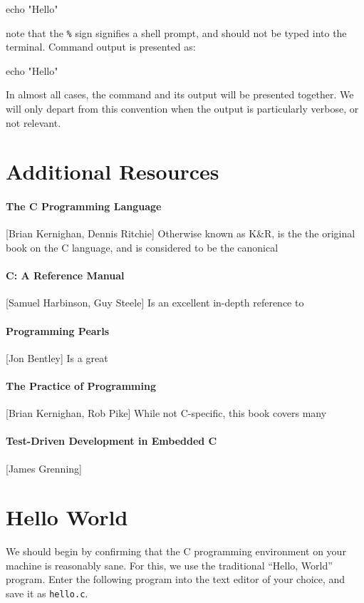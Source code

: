 \documentclass[a4paper,10pt]{article}
\newcommand{\filename}[1]{\texttt{#1}}
\begin{document}
\bash[script]
echo "Hello"
\END

\noindent
note that the \texttt{\%} sign signifies a shell prompt, and should
not be typed into the terminal. Command output is presented as:

\bash[stdout]
echo "Hello"
\END

\noindent
In almost all cases, the command and its output will be presented
together. We will only depart from this convention when the output is
particularly verbose, or not relevant.

\section{Additional Resources}

\paragraph{The C Programming Language} [Brian Kernighan, Dennis
  Ritchie] Otherwise known as K\&R, is the the original book on the C
language, and is considered to be the canonical 

\paragraph{C: A Reference Manual} [Samuel Harbinson, Guy Steele] Is an
excellent in-depth reference to

\paragraph{Programming Pearls} [Jon Bentley] Is a great

\paragraph{The Practice of Programming} [Brian Kernighan, Rob Pike]
While not C-specific, this book covers many 

\paragraph{Test-Driven Development in Embedded C} [James Grenning]

\section{Hello World}

We should begin by confirming that the C programming environment on
your machine is reasonably sane. For this, we use the traditional
``Hello, World'' program. Enter the following program into the text
editor of your choice, and save it as \filename{hello.c}.
\end{document}
